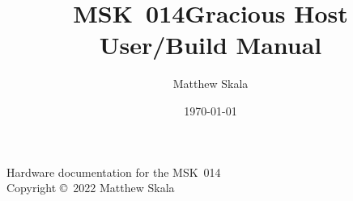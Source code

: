 \documentclass{ncmanual}
\title{MSK~014\quad Gracious Host\\User/Build Manual}
\author{Matthew Skala}
\date{\today}
\begin{document}
\maketitle


\begin{copyrightpage}
Hardware documentation for the MSK~014\\
Copyright \copyright\ 2022 Matthew Skala

\GPLThreeStatement
\end{copyrightpage}

\tableofcontents


\texdependspdfworkaround















\end{document}
